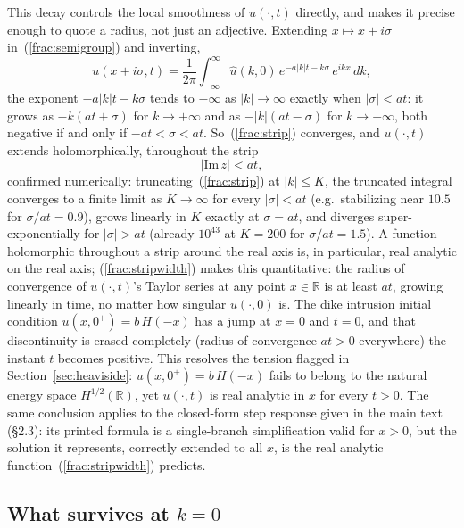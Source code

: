 \documentclass{article}
\begin{document}
This decay controls the local smoothness of $u(\cdot,t)$ directly, and
makes it precise enough to quote a radius, not just an adjective. Extending
$x\mapsto x+i\sigma$ in~(\ref{frac:semigroup}) and inverting,
\begin{equation}
u(x+i\sigma,t) = \frac{1}{2\pi}\int_{-\infty}^{\infty}
  \hat u(k,0)\,e^{-a|k|t-k\sigma}\,e^{ikx}\,dk,
\label{frac:strip}
\end{equation}
the exponent $-a|k|t-k\sigma$ tends to $-\infty$ as $|k|\to\infty$ exactly
when $|\sigma|<at$: it grows as $-k(at+\sigma)$ for $k\to+\infty$ and as
$-|k|(at-\sigma)$ for $k\to-\infty$, both negative if and only if
$-at<\sigma<at$. So~(\ref{frac:strip}) converges, and $u(\cdot,t)$ extends
holomorphically, throughout the strip
\begin{equation}
|\mathrm{Im}\,z| < at,
\label{frac:stripwidth}
\end{equation}
confirmed numerically: truncating~(\ref{frac:strip}) at $|k|\le K$, the
truncated integral converges to a finite limit as $K\to\infty$ for every
$|\sigma|<at$ (e.g.\ stabilizing near $10.5$ for $\sigma/at=0.9$), grows
linearly in $K$ exactly at $\sigma=at$, and diverges super-exponentially
for $|\sigma|>at$ (already $10^{43}$ at $K=200$ for $\sigma/at=1.5$).
A function holomorphic throughout a strip around the real axis is, in
particular, real analytic on the real axis; (\ref{frac:stripwidth}) makes
this quantitative: the radius of convergence of $u(\cdot,t)$'s Taylor
series at any point $x\in\mathbb{R}$ is at least $at$, growing linearly in
time, no matter how singular $u(\cdot,0)$ is. The dike intrusion initial
condition $u(x,0^+)=b\,H(-x)$ has a jump at $x=0$ and $t=0$, and
that discontinuity is erased completely (radius of convergence $at>0$
everywhere) the instant $t$ becomes positive. This resolves
the tension flagged in Section~\ref{sec:heaviside}: $u(x,0^+)=b\,H(-x)$
fails to belong to the natural energy space $H^{1/2}(\mathbb{R})$, yet
$u(\cdot,t)$ is real analytic in $x$ for every $t>0$. The same conclusion
applies to the closed-form step response given in the main text (§2.3): its
printed formula is a single-branch simplification valid for $x>0$, but the
solution it represents, correctly extended to all $x$, is the real analytic
function~(\ref{frac:stripwidth}) predicts.

\subsection{What survives at $k=0$}
\label{sec:semigroup-k0}
\end{document}
